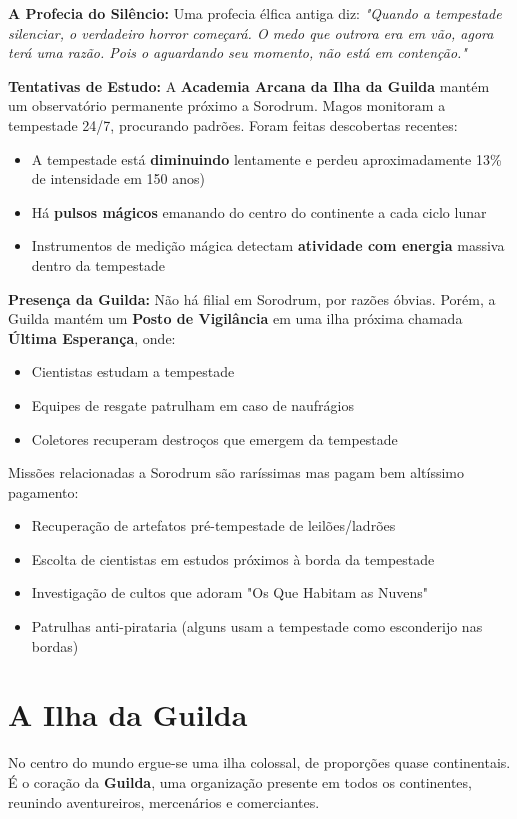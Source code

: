 \textbf{\ringmfamily A Profecia do Silêncio:}
Uma profecia élfica antiga diz:
\textit{"Quando a tempestade silenciar, o verdadeiro horror começará. O medo que outrora era em vão, agora terá uma razão. Pois o aguardando seu momento, não está em contenção."}

\textbf{\ringmfamily Tentativas de Estudo:}
A \textbf{Academia Arcana da Ilha da Guilda} mantém um observatório permanente próximo a Sorodrum. Magos monitoram a tempestade 24/7, procurando padrões. Foram feitas descobertas recentes:
\begin{itemize}
    \item A tempestade está \textbf{diminuindo} lentamente e perdeu aproximadamente 13\% de intensidade em 150 anos)
    \item Há \textbf{pulsos mágicos} emanando do centro do continente a cada ciclo lunar
    \item Instrumentos de medição mágica detectam \textbf{atividade com energia} massiva dentro da tempestade
\end{itemize}

\textbf{\ringmfamily Presença da Guilda:}
Não há filial em Sorodrum, por razões óbvias. Porém, a Guilda mantém um \textbf{Posto de Vigilância} em uma ilha próxima chamada \textbf{Última Esperança}, onde:
\begin{itemize}
    \item Cientistas estudam a tempestade
    \item Equipes de resgate patrulham em caso de naufrágios
    \item Coletores recuperam destroços que emergem da tempestade
\end{itemize}

Missões relacionadas a Sorodrum são raríssimas mas pagam bem altíssimo pagamento:
\begin{itemize}
    \item Recuperação de artefatos pré-tempestade de leilões/ladrões
    \item Escolta de cientistas em estudos próximos à borda da tempestade
    \item Investigação de cultos que adoram "Os Que Habitam as Nuvens"
    \item Patrulhas anti-pirataria (alguns usam a tempestade como esconderijo nas bordas)
\end{itemize}

\section*{A Ilha da Guilda}
No centro do mundo ergue-se uma ilha colossal, de proporções quase continentais. É o coração da \textbf{Guilda}, uma organização presente em todos os continentes, reunindo aventureiros, mercenários e comerciantes.

